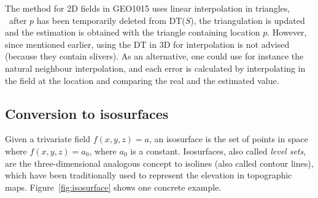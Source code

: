 The method for 2D fields in GEO1015 uses linear interpolation in triangles, \ie\ after $p$ has been temporarily deleted from DT($S$), the triangulation is updated and the estimation is obtained with the triangle containing location $p$. 
However, since mentioned earlier, using the DT in 3D for interpolation is not advised (because they contain slivers).
As an alternative, one could use for instance the natural neighbour interpolation, and each error is calculated by interpolating in the field at the location and comparing the real and the estimated value.


\subsection{Conversion to isosurfaces}

Given a trivariate field $f(x,y,z) = a$, an isosurface is the set of points in space where $f(x,y,z) = a_0$, where $a_0$ is a constant. 
Isosurfaces, also called \emph{level sets}, are the three-dimensional analogous concept to isolines (also called contour lines), which have been traditionally used to represent the elevation in topographic maps. 
Figure~\ref{fig:isosurface} shows one concrete example.
